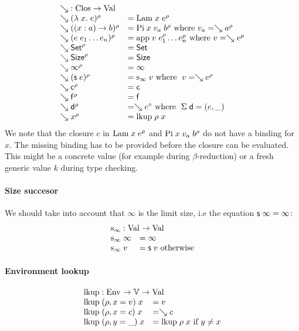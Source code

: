 \[
\begin{array}{ll}
\multicolumn{2}{l}{\wh \; : \Clos \ra \Val}\\
\wh \clp{\lam{x}{e}}{\rho} & = \vlam \; x \; \cl{e}{\rho} \\
\wh \clp{\EPi{x}{a}{b}}{\rho} &= \vpi \; x \; v_a \; \cl{b}{\rho} \mbox{ where } v_a = \wh \cl{a}{\rho} \\
\wh \clp{e \; e_1 \ldots e_n}{\rho} &= \ap \; v \; \cl{e_1}{\rho} \ldots \cl{e_n}{\rho} \mbox{ where } v = \wh \cl{e}{\rho} \\
\wh \cl{\Set}{\rho} & = \Set \\ 
\wh \cl{\Size}{\rho} & = \Size \\
\wh \cl{\infty}{\rho} & = \infty  \\
\wh \clp{\s e}{\rho} & = \sinfty \; v \mbox{ where } \; v = \wh \cl{e}{\rho} \\ 
\wh \cl{\cc}{\rho} & = \cc  \\
\wh \cl{\ff}{\rho} & = \ff \\
\wh \cl{\dd}{\rho} & = \wh \cl{e}{\diamond} \mbox{ where } \; \Sig \; \dd = (e,\_)\\
\wh \cl{x}{\rho} & = \lkup \; \rho \; x \\
\end{array}
\]
We note that the closure $c$  in $\mathrm{Lam} \; x \; e^{\rho}$
and $\mathrm{Pi} \; x \; v_a \; b^{\rho}$ do not have a binding for $x$.
The missing binding has to be provided before the closure can be evaluated.
This might be a concrete value (for example during $\beta$-reduction) or a
fresh generic value $k$ during type checking.

\paragraph*{Size succesor}
We should take into account that $\infty$ is the limit size, i.e the equation $\mathsf{s}\; \infty = \infty$:
\[
\begin{array}[t]{ll}
\multicolumn{2}{l}{\sinfty : \Val \ra \Val}\\ 
\sinfty \; \infty & = \infty\\
\sinfty \;  v & = \s v  \mbox{ otherwise}\\ 
\end{array}
\]

\paragraph*{Environment lookup}
\[
\begin{array}{ll}
\multicolumn{2}{l}{\lkup : \Env \ra \cV \ra \Val }\\
\lkup \; (\ins{\rho}{x}{v}) \; x & = v \\
\lkup \; (\ins{\rho}{x}{c}) \; x & = \wh c \\
\lkup \; (\ins{\rho}{y}{\_}) \; x & = \lkup \; \rho \; x \mbox{ if } y \neq x  
\end{array}
\]

